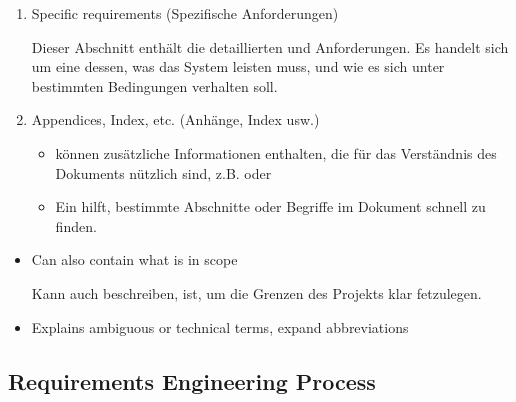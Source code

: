  \begin{defBox}
    \begin{enumerate}[start=3]
        \item Specific requirements (Spezifische Anforderungen)
        \begin{infoBox}
            Dieser Abschnitt enthält die detaillierten  und  Anforderungen. Es handelt sich um eine  dessen, was das System leisten muss, und wie es sich unter bestimmten Bedingungen verhalten soll.
        \end{infoBox}
        \item Appendices, Index, etc. (Anhänge, Index usw.)
        \begin{infoBox}
            \begin{itemize}
                \item {} können zusätzliche Informationen enthalten, die für das Verständnis des Dokuments nützlich sind, z.B.  oder 
                \item Ein  hilft, bestimmte Abschnitte oder Begriffe im Dokument schnell zu finden.
            \end{itemize}
        \end{infoBox}
    \end{enumerate}
\end{defBox}
\begin{itemize}
    \item {} Can also contain what is  in scope
    \begin{infoBox}
        Kann auch beschreiben,  ist, um die Grenzen des Projekts klar fetzulegen.
    \end{infoBox}
    \item {} Explains ambiguous or technical terms, expand abbreviations
\end{itemize}

\subsection{Requirements Engineering Process}

